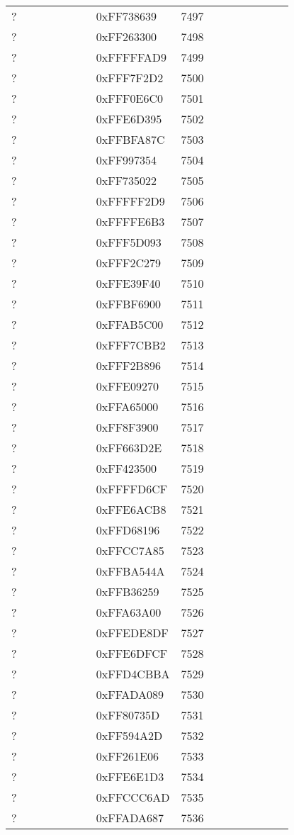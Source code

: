 \begin{longtable}{p{0.3\linewidth} p{0.3\linewidth} p{0.4\linewidth}}
? &  0xFF738639 &  7497\\
? &  0xFF263300 &  7498\\
? &  0xFFFFFAD9 &  7499\\
? &  0xFFF7F2D2 &  7500\\
? &  0xFFF0E6C0 &  7501\\
? &  0xFFE6D395 &  7502\\
? &  0xFFBFA87C &  7503\\
? &  0xFF997354 &  7504\\
? &  0xFF735022 &  7505\\
? &  0xFFFFF2D9 &  7506\\
? &  0xFFFFE6B3 &  7507\\
? &  0xFFF5D093 &  7508\\
? &  0xFFF2C279 &  7509\\
? &  0xFFE39F40 &  7510\\
? &  0xFFBF6900 &  7511\\
? &  0xFFAB5C00 &  7512\\
? &  0xFFF7CBB2 &  7513\\
? &  0xFFF2B896 &  7514\\
? &  0xFFE09270 &  7515\\
? &  0xFFA65000 &  7516\\
? &  0xFF8F3900 &  7517\\
? &  0xFF663D2E &  7518\\
? &  0xFF423500 &  7519\\
? &  0xFFFFD6CF &  7520\\
? &  0xFFE6ACB8 &  7521\\
? &  0xFFD68196 &  7522\\
? &  0xFFCC7A85 &  7523\\
? &  0xFFBA544A &  7524\\
? &  0xFFB36259 &  7525\\
? &  0xFFA63A00 &  7526\\
? &  0xFFEDE8DF &  7527\\
? &  0xFFE6DFCF &  7528\\
? &  0xFFD4CBBA &  7529\\
? &  0xFFADA089 &  7530\\
? &  0xFF80735D &  7531\\
? &  0xFF594A2D &  7532\\
? &  0xFF261E06 &  7533\\
? &  0xFFE6E1D3 &  7534\\
? &  0xFFCCC6AD &  7535\\
? &  0xFFADA687 &  7536\\

\end{longtable}
